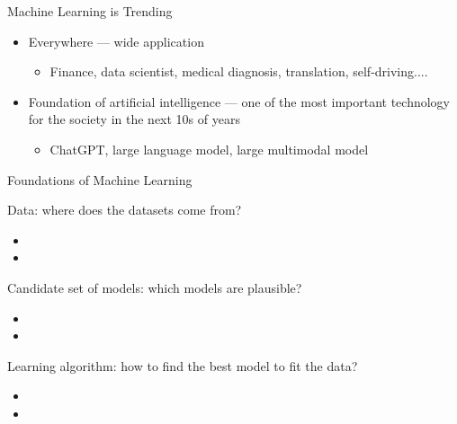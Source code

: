 \documentclass[aspectratio=169,12pt]{beamer}
\begin{document}
\begin{frame}[t]{Machine Learning is Trending}
  \vspace{0.65cm}
  {\large
  \begin{itemize}
    \setlength{\itemsep}{0.72cm}
    \item Everywhere --- wide application
    \vspace{0.2cm}
      \begin{itemize}
        \item Finance, data scientist, medical diagnosis, translation, self-driving....
      \end{itemize}
    \item Foundation of artificial intelligence --- one of the most important
          technology for the society in the next 10s of years
          \vspace{0.2cm}
      \begin{itemize}
        \item ChatGPT, large language model, large multimodal model
      \end{itemize}
  \end{itemize}
  }
\end{frame}



\begin{frame}[t]{Foundations of Machine Learning}



\begin{itemize}
	\vspace{0.5cm}
	{\large
	    \setlength{\itemsep}{0.5cm}
	\item Data: where does the datasets come from? 
	\vspace{0.2cm}
	\begin{itemize}
		\item[] 
		\item[] 
	\end{itemize}
	\item Candidate set of models: which models are plausible?
		\vspace{0.2cm}
	\begin{itemize}
		\item[] 
		\item[] 
	\end{itemize}
	\item Learning algorithm: how to find the best model to fit the data?
	\vspace{0.2cm}
	\begin{itemize}
		\item[] 
		\item[] 
		\end{itemize}
}
\end{itemize}
	
	
\end{frame}
\end{document}
